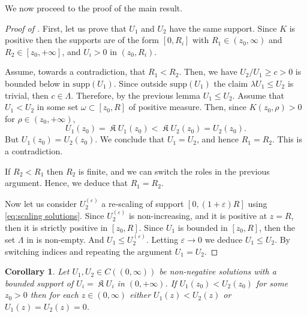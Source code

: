\documentclass[a4paper]{article}
\newtheorem{corollary}[theorem]{Corollary}
\theoremstyle{definition}
\DeclareMathOperator{\fixedpoint}{\mathfrak K}
\begin{document}
%
%
%
%
%
%
%
We now proceed to the proof of the main result.
\begin{proof}[Proof of ]
First, let us prove that $U_1$ and $U_2$ have the same support. Since $K$ is positive then the supports are of the form $[0,R_i]$ with $R_1 \in (z_0,\infty)$ and $R_2 \in [z_0,+\infty]$, and $U_i > 0$ in $(z_0,R_i)$.

Assume, towards a contradiction, that $R_1 < R_2$. Then, we have $U_2/U_1 \ge c > 0$ is bounded below in $\text{supp}(U_1)$.
Since outside $\text{supp}(U_1)$ the claim $\lambda U_1 \le U_2$ is trivial, then $c \in \Lambda$. Therefore, by the previous lemma $U_1 \le U_2$. Assume that $U_1 < U_2$ in some set $\omega \subset [z_0, R]$ of positive measure. Then, since $K(z_0, \rho) > 0$ for $\rho \in (z_0,+\infty)$,
$$
U_1(z_0) = \fixedpoint U_1 (z_0) < \fixedpoint U_2 (z_0) = U_2 (z_0).
$$
But $U_1(z_0) = U_2(z_0)$. We conclude that $U_1 = U_2$, and hence $R_1 = R_2$. This is a contradiction.

If $R_2 < R_1$ then $R_2$ is finite, and we can switch the roles in the previous argument. Hence, we deduce that $R_1 = R_2$.

Now let us consider $ U_2^{(\varepsilon)}$ a re-scaling of support $[0,(1+\varepsilon)R]$ using \eqref{eq:scaling solutions}.
%
%
%
Since $U_2^{(\varepsilon)}$ is non-increasing, and it is positive at $z = R$, then it is strictly positive in $[z_0,R]$. Since $U_1$ is bounded in $[z_0,R]$, then the set $\Lambda$ in  is non-empty. And $U_1 \le U_2^{(\varepsilon)}$. Letting $\varepsilon \to 0$ we deduce $U_1 \le U_2$. By switching indices and repeating the argument $U_1 = U_2$.
\end{proof}

\begin{corollary}
\label{thm:comparison principle}
Let $U_1, U_2 \in C((0,\infty))$ be non-negative solutions with a bounded support of $U_i = \fixedpoint U_i$ in $(0,+\infty)$. If $U_1(z_0) < U_2(z_0)$ for some $z_0 > 0$ then for each $z\in (0, \infty)$ either $U_1(z) < U_2(z)$ or $U_1(z) = U_2(z) = 0$.
\end{corollary}
\end{document}
